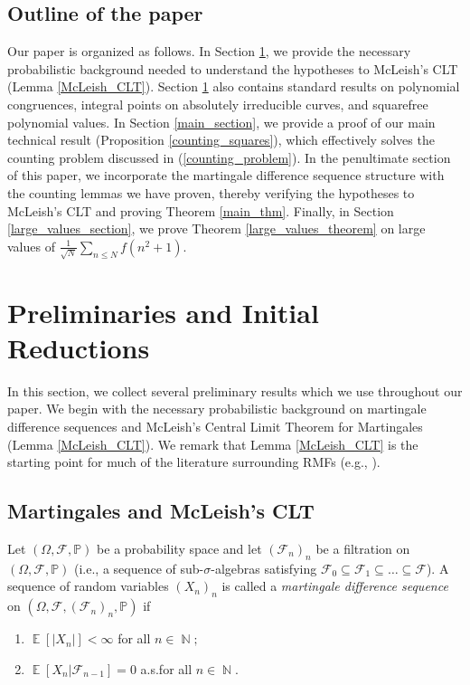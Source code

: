 \documentclass[11pts]{amsart}
\numberwithin{equation}{section}
\DeclareMathOperator{\E}{\mathbb{E}}
\DeclareMathOperator{\N}{\mathbb{N}}
\begin{document}
\subsection{Outline of the paper} 

Our paper is organized as follows. In Section \ref{preliminaries}, we provide the necessary probabilistic background needed to understand the hypotheses to McLeish's CLT (Lemma \ref{McLeish_CLT}). Section \ref{preliminaries} also contains standard results on polynomial congruences, integral points on absolutely irreducible curves, and squarefree polynomial values. In Section \ref{main_section}, we provide a proof of our main technical result (Proposition \ref{counting_squares}), which effectively solves the counting problem discussed in (\ref{counting_problem}). In the penultimate section of this paper, we incorporate the martingale difference sequence structure with the counting lemmas we have proven, thereby verifying the hypotheses to McLeish's CLT and proving Theorem \ref{main_thm}. Finally, in Section \ref{large_values_section}, we prove Theorem \ref{large_values_theorem} on large values of $\frac{1}{\sqrt{N}}\sum_{n\leq N}f(n^2+1)$.


\section{Preliminaries and Initial Reductions}
\label{preliminaries}

In this section, we collect several preliminary results which we use throughout our paper. We begin with the necessary probabilistic background on martingale difference sequences and McLeish's Central Limit Theorem for Martingales (Lemma \ref{McLeish_CLT}). We remark that Lemma \ref{McLeish_CLT} is the starting point for much of the literature surrounding RMFs (e.g., \cite{Harper_Martingale,Oleksiy-RandomChowla}). 




\subsection{Martingales and McLeish's CLT}

Let $(\Omega, \mathcal{F}, \mathbb{P})$ be a probability space and let $(\mathcal{F}_n)_n$ be a filtration on $(\Omega, \mathcal{F}, \mathbb{P})$ (i.e., a sequence of sub-$\sigma$-algebras satisfying $\mathcal{F}_0\subseteq \mathcal{F}_1\subseteq\dots\subseteq \mathcal{F}$). A sequence of random variables $(X_n)_n$ is called a \textit{martingale difference sequence} on $(\Omega, \mathcal{F}, (\mathcal{F}_n)_n,\mathbb{P})$ if
\begin{enumerate}
    \item $\E\left[|X_n|\right]<\infty$ for all $n\in\N;$
    \item $\E\left[X_n|\mathcal{F}_{n-1}\right]=0$ a.s.\;for all $n\in \N$.
\end{enumerate}
\end{document}
